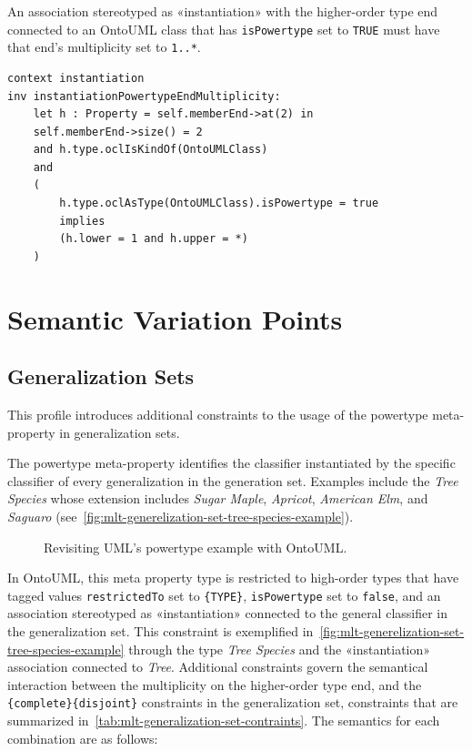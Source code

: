 \begin{constraint}
\label{constraint:instantiationPowertypeEndMultiplicity}
An association stereotyped as «instantiation» with the higher-order type end connected to an OntoUML class that has \texttt{isPowertype} set to \texttt{TRUE} must have that end's multiplicity set to \texttt{1..*}.

\begin{lstlisting}[language=OCL]
context instantiation
inv instantiationPowertypeEndMultiplicity:
    let h : Property = self.memberEnd->at(2) in
    self.memberEnd->size() = 2
    and h.type.oclIsKindOf(OntoUMLClass)
    and
    (
        h.type.oclAsType(OntoUMLClass).isPowertype = true
        implies
        (h.lower = 1 and h.upper = *)
    )
\end{lstlisting}
\end{constraint}

\section{Semantic Variation Points}
\label{sec:mlt-profile-semantic-variation}

\subsection{Generalization Sets}
\label{uml:generalization-sets}

This profile introduces additional constraints to the usage of the powertype meta-property in generalization sets.

The powertype meta-property identifies the classifier instantiated by the specific classifier of every generalization in the generation set. Examples include the \textit{Tree Species} whose extension includes \textit{Sugar Maple}, \textit{Apricot}, \textit{American Elm}, and \textit{Saguaro} (see~\autoref{fig:mlt-generelization-set-tree-species-example}).

\begin{figure}[h]
    \centering
    
    \caption{Revisiting UML's powertype example with OntoUML.}
    \label{fig:mlt-generelization-set-tree-species-example}
\end{figure}


In OntoUML, this meta property type is restricted to high-order types that have tagged values \texttt{restrictedTo} set to \texttt{\{TYPE\}},  \texttt{isPowertype} set to \texttt{false}, and an association stereotyped as «instantiation» connected to the general classifier in the generalization set. This constraint is exemplified in~\autoref{fig:mlt-generelization-set-tree-species-example} through the type \textit{Tree Species} and the «instantiation» association connected to \textit{Tree}. Additional constraints govern the semantical interaction between the multiplicity on the higher-order type end, and the \texttt{\{complete\}}\/\texttt{\{disjoint\}} constraints in the generalization set, constraints that are summarized in~\autoref{tab:mlt-generalization-set-contraints}. The semantics for each combination are as follows:

